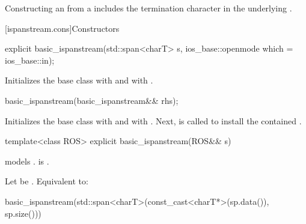 \pnum
\begin{note}
Constructing an  from a 
includes the termination character 
in the underlying .
\end{note}

[ispanstream.cons]{Constructors}

%
\begin{itemdecl}
explicit basic_ispanstream(std::span<charT> s, ios_base::openmode which = ios_base::in);
\end{itemdecl}

\begin{itemdescr}
\pnum
\effects
Initializes the base class with
and  with
.
\end{itemdescr}

%
\begin{itemdecl}
basic_ispanstream(basic_ispanstream&& rhs);
\end{itemdecl}

\begin{itemdescr}
\pnum
\effects
Initializes the base class with 
and  with .
Next,  is called
to install the contained .
\end{itemdescr}

%
\begin{itemdecl}
template<class ROS> explicit basic_ispanstream(ROS&& s)
\end{itemdecl}

\begin{itemdescr}
\pnum
\constraints
{} models .
is .

\pnum
\effects
Let  be .
Equivalent to:
\begin{codeblock}
basic_ispanstream(std::span<charT>(const_cast<charT*>(sp.data()), sp.size()))
\end{codeblock}
\end{itemdescr}

